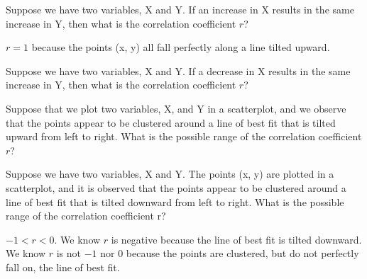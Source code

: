 \documentclass[11pt, chapterprefix=true]{scrbook}\usepackage[]{graphicx}\usepackage[]{color}
\begin{document}
\begin{exercises}
\begin{solution}
\end{solution}

\begin{exercise} %

Suppose we have two variables, X and Y. If an increase in X results in the same increase in Y, then what is the correlation coefficient $r$?
\end{exercise}
\begin{solution} %

$r = 1$ because the points (x, y) all fall perfectly along a line tilted upward.

\end{solution}

\begin{exercise} %

Suppose we have two variables, X and Y. If a decrease in X results in the same increase in Y, then what is the correlation coefficient $r$?
\end{exercise}
\begin{solution} %

\end{solution}

\begin{exercise} %

Suppose that we plot two variables, X, and Y in a scatterplot, and we observe that the points appear to be clustered around a line of best fit that is tilted upward from left to right.  What is the possible range of the correlation coefficient $r$?
\end{exercise}
\begin{solution} %


\end{solution}

\begin{exercise} %

Suppose we have two variables, X and Y. The points (x, y) are plotted in a scatterplot, and it is observed that the points appear to be clustered around a line of best fit that is tilted downward from left to right. What is the possible range of the correlation coefficient r?

\end{exercise}
\begin{solution} %

$ -1 < r < 0$. We know $r$ is negative because the line of best fit is tilted downward. We know $r$ is not $-1$ nor $0$ because the points are clustered, but do not perfectly fall on, the line of best fit.


\end{solution}
\end{exercises}
\end{document}
